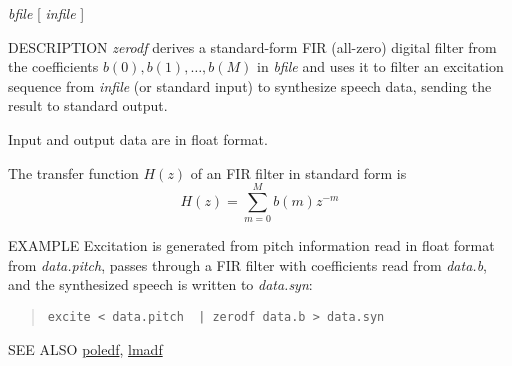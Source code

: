 \begin{synopsis}
\item[zerodf] [ --m $M$ ] [ --p $P$ ] [ --i $I$ ] [ --t ] [ --k ]
		{\em bfile} [ {\em infile} ]
\end{synopsis}

\begin{qsection}{DESCRIPTION}
{\em zerodf} derives a standard-form FIR (all-zero) digital filter 
from the coefficients $b(0), b(1), \dots, b(M)$ in {\em bfile} 
and uses it to filter an excitation sequence 
from {\em infile} (or standard input) to synthesize speech data, 
sending the result to standard output.

Input and output data are in float format.

The transfer function $H(z)$ of an FIR filter in standard form is
\begin{displaymath}
H(z) = \sum_{m=0}^{M} b(m) z^{-m}
\end{displaymath}
\end{qsection}

\begin{options}
\end{options}

\begin{qsection}{EXAMPLE}
Excitation is generated from pitch information read in float format
from {\em data.pitch}, passes through a FIR filter with
coefficients read from {\em data.b},
and the synthesized speech is written to {\em data.syn}:
\begin{quote}
  \verb!excite < data.pitch  | zerodf data.b > data.syn!
\end{quote}
\end{qsection}

\begin{qsection}{SEE ALSO}
\hyperlink{poledf}{poledf},
\hyperlink{lmadf}{lmadf}
\end{qsection}
